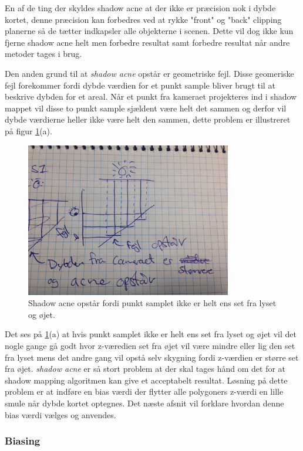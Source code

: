 \documentclass[11pt,a4paper]{article}
\begin{document}
En af de ting der skyldes shadow acne at der ikke er præcision nok i dybde kortet, denne præcision kan forbedres ved at rykke  "front"  og "back" clipping planerne så de tætter indkapsler alle objekterne i scenen. Dette vil dog ikke kun fjerne shadow acne helt men forbedre resultat samt forbedre resultat når andre metoder tages i brug. 


Den anden grund til at \textit{shadow acne} opstår er geometriske fejl. Disse geomeriske fejl forekommer fordi dybde værdien for et punkt sample bliver brugt til at beskrive dybden for et areal. Når et punkt fra kameraet projekteres ind i shadow mappet vil disse to punkt sample sjældent være helt det sammen og derfor vil dybde værdierne heller ikke være helt den sammen, dette problem er illustreret på figur \ref{S1}(a).

\begin{figure}[ht!]
\centering
\includegraphics[width=90mm]{img/S1.jpg}
\caption{Shadow acne opstår fordi punkt samplet ikke er helt ens set fra lyset og øjet.}
\label{S1}
\end{figure}

Det ses på \ref{S1}(a) at hvis punkt samplet ikke er helt ens set fra lyset og øjet vil det nogle gange gå godt hvor z-væredien set fra øjet vil være mindre eller lig den set fra lyset mens det andre gang vil opstå selv skygning fordi z-værdien er større set fra øjet. \textit{shadow acne} er så stort problem at der skal tages hånd om det for at shadow mapping algoritmen kan give et acceptabelt resultat. Løsning på dette problem er at indføre en bias værdi der flytter alle polygoners z-værdi en lille smule når dybde kortet optegnes. Det næste afsnit vil forklare hvordan denne bias værdi vælges og anvendes.


\subsubsection{Biasing}
\end{document}

